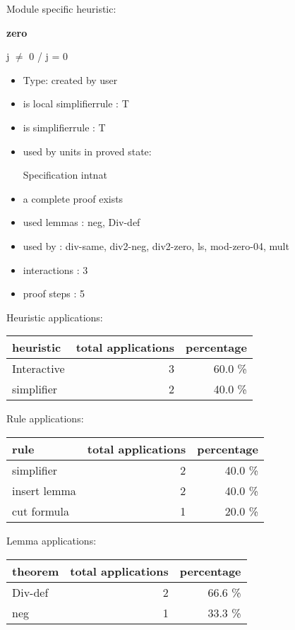 \documentclass[a4paper]{article}
\begin{document}
Module specific heuristic:

\pagebreak

{\LARGE\bf zero}\label{lemma-zero}

\medskip

j $\neq$ 0  / j = 0

\begin{itemize}

\item Type: created by user

\item is local simplifierrule : T
\item is simplifierrule : T
\item used by units in proved state:

Specification intnat
\item       a complete proof exists
\item       used lemmas  : neg, Div-def
\item       used by      : div-same, div2-neg, div2-zero, ls, mod-zero-04, mult
\item       interactions : 3
\item       proof steps  : 5
\end{itemize}

\medskip


Heuristic applications:

\begin{supertabular}{l|r|r}
heuristic	& total applications & percentage \\ \hline
Interactive & 3 & 60.0 \% \\
simplifier & 2 & 40.0 \% \\

\end{supertabular}

Rule applications:

\begin{supertabular}{l|r|r}
rule	        & total applications & percentage \\ \hline
simplifier & 2 & 40.0 \% \\
insert lemma & 2 & 40.0 \% \\
cut formula & 1 & 20.0 \% \\

\end{supertabular}

Lemma applications:

\begin{supertabular}{l|r|r}
theorem	        & total applications & percentage \\ \hline
Div-def & 2 & 66.6 \% \\
neg & 1 & 33.3 \% \\

\end{supertabular}
\end{document}
